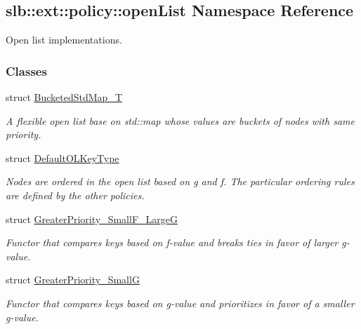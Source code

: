 \hypertarget{namespaceslb_1_1ext_1_1policy_1_1openList}{}\subsection{slb\+:\+:ext\+:\+:policy\+:\+:open\+List Namespace Reference}
\label{namespaceslb_1_1ext_1_1policy_1_1openList}


Open list implementations.  


\subsubsection*{Classes}
\begin{DoxyCompactItemize}
\item 
struct \hyperlink{structslb_1_1ext_1_1policy_1_1openList_1_1BucketedStdMap__T}{Bucketed\+Std\+Map\+\_\+T}
\begin{DoxyCompactList}\small\item\em A flexible open list base on {\ttfamily std\+::map} whose values are buckets of nodes with same priority. \end{DoxyCompactList}\item 
struct \hyperlink{structslb_1_1ext_1_1policy_1_1openList_1_1DefaultOLKeyType}{Default\+O\+L\+Key\+Type}
\begin{DoxyCompactList}\small\item\em Nodes are ordered in the open list based on g and f. The particular ordering rules are defined by the other policies. \end{DoxyCompactList}\item 
struct \hyperlink{structslb_1_1ext_1_1policy_1_1openList_1_1GreaterPriority__SmallF__LargeG}{Greater\+Priority\+\_\+\+Small\+F\+\_\+\+LargeG}
\begin{DoxyCompactList}\small\item\em Functor that compares keys based on f-\/value and breaks ties in favor of larger g-\/value. \end{DoxyCompactList}\item 
struct \hyperlink{structslb_1_1ext_1_1policy_1_1openList_1_1GreaterPriority__SmallG}{Greater\+Priority\+\_\+\+SmallG}
\begin{DoxyCompactList}\small\item\em Functor that compares keys based on g-\/value and prioritizes in favor of a smaller g-\/value. \end{DoxyCompactList}\end{DoxyCompactItemize}
